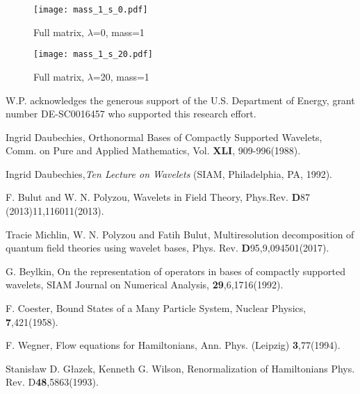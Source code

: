 \documentclass[aps,prc,reprint,showpacs,groupedaddress,onecolumn]{revtex4}
\begin{document}
\begin{figure}
\begin{minipage}[t]{.45\linewidth}
\centering
\texttt{[image: mass\_1\_s\_0.pdf]}
\caption{Full matrix, $\lambda$=0, mass=1}
\label{fig:1}
\end{minipage}
\begin{minipage}[t]{.45\linewidth}
\centering
\texttt{[image: mass\_1\_s\_20.pdf]}
\caption{Full matrix, $\lambda$=20, mass=1}
\label{fig:2}
\end{minipage}
\end{figure}

W.P. acknowledges the generous support of the U.S. Department of Energy,
grant number DE-SC0016457 who supported this research effort.

\begin{thebibliography}{}

 Ingrid Daubechies, 
Orthonormal Bases of Compactly Supported Wavelets, 
Comm. on Pure and Applied Mathematics,
Vol. {\bf XLI}, 909-996(1988). 

 Ingrid Daubechies,{\it Ten Lecture on Wavelets} 
(SIAM, Philadelphia, PA, 1992). 

 F. Bulut and W. N. Polyzou, 
Wavelets in Field Theory,
Phys.Rev. {\bf D}87 (2013)11,116011(2013).

 Tracie Michlin, W. N. Polyzou and Fatih Bulut,
Multiresolution decomposition of quantum field theories using wavelet bases, 
Phys. Rev. {\bf D}95,9,094501(2017).
 
 G. Beylkin,
On the representation of operators in bases of compactly 
supported wavelets, 
SIAM Journal on Numerical Analysis, {\bf 29},6,1716(1992). 




 F. Coester, Bound States of a Many Particle System,
Nuclear Physics, {\bf 7},421(1958).

 F. Wegner,
Flow equations for Hamiltonians, Ann. Phys. (Leipzig) {\bf 3},77(1994). 

Stanis{\l}aw D. G{\l}azek, Kenneth G. Wilson,
Renormalization of Hamiltonians
Phys. Rev. D{\bf 48},5863(1993).

\end{thebibliography}
\end{document}
